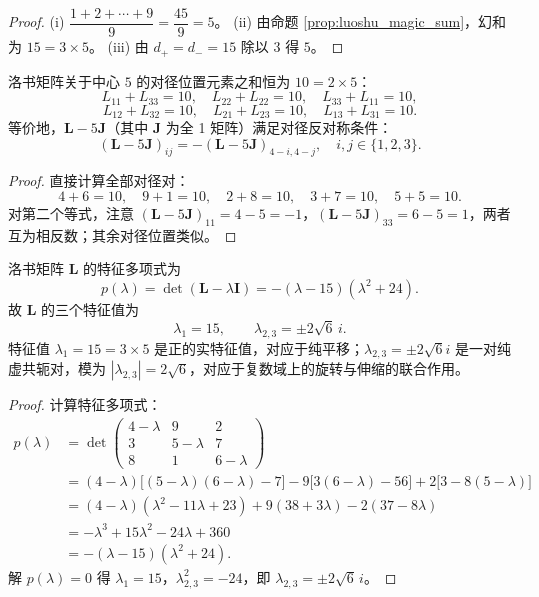 \begin{proof}
(i) $\dfrac{1 + 2 + \cdots + 9}{9} = \dfrac{45}{9} = 5$。
(ii) 由命题 \ref{prop:luoshu_magic_sum}，幻和为 $15 = 3 \times 5$。
(iii) 由 $d_+ = d_- = 15$ 除以 $3$ 得 $5$。
\end{proof}

\begin{proposition}[洛书的对径平衡]\label{prop:luoshu_antipodal}
洛书矩阵关于中心 $5$ 的对径位置元素之和恒为 $10 = 2 \times 5$：
\[
L_{11} + L_{33} = 10, \quad L_{22} + L_{22} = 10, \quad L_{33} + L_{11} = 10,
\]
\[
L_{12} + L_{32} = 10, \quad L_{21} + L_{23} = 10, \quad L_{13} + L_{31} = 10.
\]
等价地，$\mathbf{L} - 5\mathbf{J}$（其中 $\mathbf{J}$ 为全 1 矩阵）满足对径反对称条件：
\[
(\mathbf{L} - 5\mathbf{J})_{ij} = -(\mathbf{L} - 5\mathbf{J})_{4-i, 4-j}, \quad i, j \in \{1, 2, 3\}.
\]
\end{proposition}

\begin{proof}
直接计算全部对径对：
\[
4 + 6 = 10, \quad 9 + 1 = 10, \quad 2 + 8 = 10, \quad 3 + 7 = 10, \quad 5 + 5 = 10.
\]
对第二个等式，注意 $(\mathbf{L} - 5\mathbf{J})_{11} = 4 - 5 = -1$，$(\mathbf{L} - 5\mathbf{J})_{33} = 6 - 5 = 1$，两者互为相反数；其余对径位置类似。
\end{proof}

\begin{theorem}[洛书矩阵的特征值与谱结构]\label{thm:luoshu_eigenvalues}
洛书矩阵 $\mathbf{L}$ 的特征多项式为
\[
p(\lambda) = \det(\mathbf{L} - \lambda \mathbf{I}) = -(\lambda - 15)(\lambda^2 + 24).
\]
故 $\mathbf{L}$ 的三个特征值为
\[
\lambda_1 = 15, \qquad \lambda_{2,3} = \pm 2\sqrt{6}\, i.
\]
特征值 $\lambda_1 = 15 = 3 \times 5$ 是正的实特征值，对应于纯平移；$\lambda_{2,3} = \pm 2\sqrt{6} i$ 是一对纯虚共轭对，模为 $|\lambda_{2,3}| = 2\sqrt{6}$，对应于复数域上的旋转与伸缩的联合作用。
\end{theorem}

\begin{proof}
计算特征多项式：
\begin{align*}
p(\lambda) &= \det \begin{pmatrix} 4 - \lambda & 9 & 2 \\ 3 & 5 - \lambda & 7 \\ 8 & 1 & 6 - \lambda \end{pmatrix} \\
&= (4 - \lambda)\bigl[(5-\lambda)(6-\lambda) - 7\bigr] - 9\bigl[3(6-\lambda) - 56\bigr] + 2\bigl[3 - 8(5-\lambda)\bigr] \\
&= (4-\lambda)(\lambda^2 - 11\lambda + 23) + 9(38 + 3\lambda) - 2(37 - 8\lambda) \\
&= -\lambda^3 + 15\lambda^2 - 24\lambda + 360 \\
&= -(\lambda - 15)(\lambda^2 + 24).
\end{align*}
解 $p(\lambda) = 0$ 得 $\lambda_1 = 15$，$\lambda_{2,3}^2 = -24$，即 $\lambda_{2,3} = \pm 2\sqrt{6}\, i$。
\end{proof}


